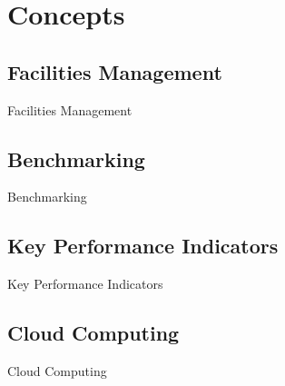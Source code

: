 
\section{Concepts}

\subsection{Facilities Management}

\begin{frame}{Facilities Management}


\end{frame}

\subsection{Benchmarking}
\begin{frame}{Benchmarking}


\end{frame}

\subsection{Key Performance Indicators}
\begin{frame}{Key Performance Indicators}


\end{frame}

\subsection{Cloud Computing}
\begin{frame}{Cloud Computing}


\end{frame}


